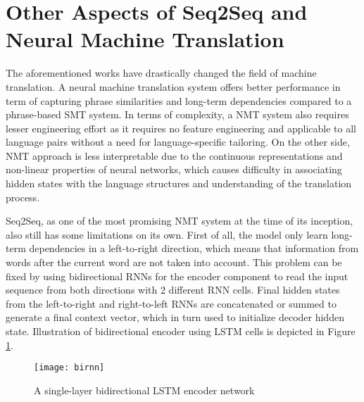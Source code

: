 \documentclass[12pt]{extarticle}
\begin{document}
\section*{Other Aspects of Seq2Seq and Neural Machine Translation} %
The aforementioned works \citep{kalchbrenner-blunsom-2013-recurrent-continuous,cho-etal-2014-learning, Sutskever:2014:SSL:2969033.2969173} have drastically changed the field of machine translation. A neural machine translation system offers better performance in term of capturing phrase similarities and long-term dependencies compared to a phrase-based SMT system. In terms of complexity, a NMT system also requires lesser engineering effort as it requires no feature engineering and applicable to all language pairs without a need for language-specific tailoring. On the other side, NMT approach is less interpretable due to the continuous representations and non-linear properties of neural networks, which causes difficulty in associating hidden states with the language structures and understanding of the translation process.

Seq2Seq, as one of the most promising NMT system at the time of its inception, also still has some limitations on its own. First of all, the model only learn long-term dependencies in a left-to-right direction, which means that information from words after the current word are not taken into account. This problem can be fixed by using bidirectional RNNs \citep{Schuster:1997:BRN:2198065.2205129} for the encoder component to read the input sequence from both directions with 2 different RNN cells. Final hidden states from the left-to-right and right-to-left RNNs are concatenated or summed to generate a final context vector, which in turn used to initialize decoder hidden state. Illustration of bidirectional encoder using LSTM cells is depicted in Figure \ref{fig:birnn}.

\begin{figure}[ht]
\centering
\texttt{[image: birnn]}
\caption{A single-layer bidirectional LSTM encoder network}
\label{fig:birnn}
\end{figure}
\end{document}
